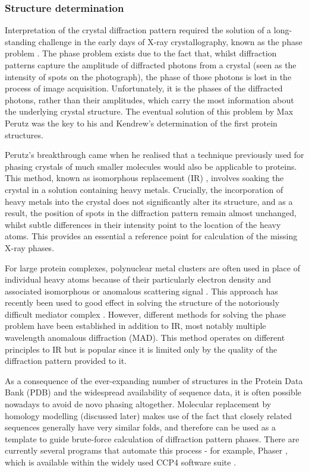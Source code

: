 \documentclass[a4paper,11pt,twoside,openright]{scrbook}
\begin{document}
\subsubsection{Structure determination}
Interpretation of the crystal diffraction pattern required the solution of a long-standing challenge in the early days of X-ray crystallography, known as the phase problem \cite{Taylor2003}. The phase problem exists due to the fact that, whilst diffraction patterns capture the amplitude of diffracted photons from a crystal (seen as the intensity of spots on the photograph), the phase of those photons is lost in the process of image acquisition. Unfortunately, it is the phases of the diffracted photons, rather than their amplitudes, which carry the most information about the underlying crystal structure. The eventual solution of this problem by Max Perutz was the key to his and Kendrew's determination of the first protein structures.

Perutz's breakthrough came when he realised that a technique previously used for phasing crystals of much smaller molecules would also be applicable to proteins. This method, known as isomorphous replacement (IR)  \cite{Robertson1936}, involves soaking the crystal in a solution containing heavy metals. Crucially, the incorporation of heavy metals into the crystal does not significantly alter its structure, and as a result, the position of spots in the diffraction pattern remain almost unchanged, whilst subtle differences in their intensity point to the location of the heavy atoms. This provides an essential a reference point for calculation of the missing X-ray phases.

For large protein complexes, polynuclear metal clusters are often used in place of individual heavy atoms because of their particularly electron density and associated isomorphous or anomalous scattering signal \cite{Dauter2005}. This approach has recently been used to good effect in solving the structure of the notoriously difficult mediator complex \cite{Nozawa2017}. However, different methods for solving the phase problem have been established in addition to IR, most notably multiple wavelength anomalous diffraction \cite{Hendrickson1991} (MAD). This method operates on different principles to IR but is popular since it is limited only by the quality of the diffraction pattern provided to it.

As a consequence of the ever-expanding number of structures in the Protein Data Bank \cite{Berman2000} (PDB) and the widespread availability of sequence data, it is often possible nowadays to avoid de novo phasing altogether. Molecular replacement by homology modelling (discussed later) makes use of the fact that closely related sequences generally have very similar folds, and therefore can be used as a template to guide brute-force calculation of diffraction pattern phases. There are currently several programs that automate this process - for example, Phaser \cite{McCoy2007}, which is available within the widely used CCP4 software suite \cite{Winn2011a}.
\end{document}
